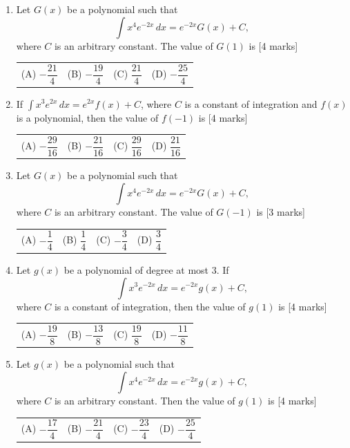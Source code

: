 \documentclass[11pt,a4paper]{article}
\begin{document}
\begin{enumerate}[resume]
{\begin{tabularx}{\linewidth}{X X X X}
\end{tabularx}}
\item Let \(G(x)\) be a polynomial such that
\[
\int x^4 e^{-2x}\,dx=e^{-2x}G(x)+C,
\]
where \(C\) is an arbitrary constant. The value of \(G(1)\) is \hfill [4 marks]
{\renewcommand{\arraystretch}{1.8}
\begin{tabularx}{\linewidth}{X X X X}
(A) \quad \(-\dfrac{21}{4}\) & (B) \quad \(-\dfrac{19}{4}\) & (C) \quad \(\dfrac{21}{4}\) & (D) \quad \(-\dfrac{25}{4}\) \\[10pt]
\end{tabularx}}
\item If \(\displaystyle \int x^{3}e^{2x}\,dx=e^{2x}f(x)+C\), where \(C\) is a constant of integration and \(f(x)\) is a polynomial, then the value of \(f(-1)\) is \hfill [4 marks]
{\renewcommand{\arraystretch}{1.8}
\begin{tabularx}{\linewidth}{X X X X}
(A) \quad \(-\dfrac{29}{16}\) & (B) \quad \(-\dfrac{21}{16}\) & (C) \quad \(\dfrac{29}{16}\) & (D) \quad \(\dfrac{21}{16}\) \\[10pt]
\end{tabularx}}
\item Let \(G(x)\) be a polynomial such that
\[
\int x^{4}e^{-2x}\,dx=e^{-2x}G(x)+C,
\]
where \(C\) is an arbitrary constant. The value of \(G(-1)\) is \hfill [3 marks]
{\renewcommand{\arraystretch}{1.8}
\begin{tabularx}{\linewidth}{X X X X}
(A) \quad \(-\dfrac{1}{4}\) & (B) \quad \(\dfrac{1}{4}\) & (C) \quad \(-\dfrac{3}{4}\) & (D) \quad \(\dfrac{3}{4}\) \\[10pt]
\end{tabularx}}
\item Let $g(x)$ be a polynomial of degree at most $3$. If
\[
\int x^3e^{-2x}\,dx=e^{-2x}g(x)+C,
\]
where $C$ is a constant of integration, then the value of $g(1)$ is \hfill [4 marks]
{\renewcommand{\arraystretch}{1.8}
\begin{tabularx}{\linewidth}{X X X X}
(A) \quad $-\dfrac{19}{8}$ & (B) \quad $-\dfrac{13}{8}$ & (C) \quad $\dfrac{19}{8}$ & (D) \quad $-\dfrac{11}{8}$ \\[10pt]
\end{tabularx}}
\item Let \(g(x)\) be a polynomial such that
\[
\int x^{4}e^{-2x}\,dx=e^{-2x}g(x)+C,
\]
where \(C\) is an arbitrary constant. Then the value of \(g(1)\) is \hfill [4 marks]
{\renewcommand{\arraystretch}{1.8}
\begin{tabularx}{\linewidth}{X X X X}
(A) \quad \(-\dfrac{17}{4}\) & (B) \quad \(-\dfrac{21}{4}\) & (C) \quad \(-\dfrac{23}{4}\) & (D) \quad \(-\dfrac{25}{4}\) \\[10pt]

\end{tabularx}}
\end{enumerate}
\end{document}
